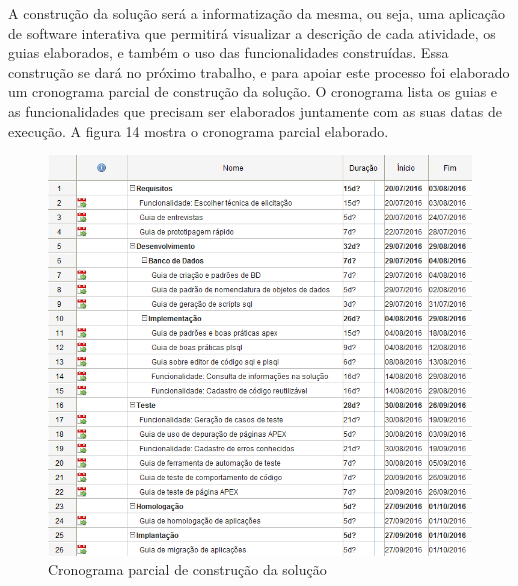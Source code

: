 A construção da solução será a informatização da mesma, ou seja, uma aplicação de software interativa que permitirá visualizar a descrição de cada atividade, os guias elaborados, e também o uso das funcionalidades construídas. Essa construção se dará no próximo trabalho, e para apoiar este processo foi elaborado um cronograma parcial de construção da solução. O cronograma lista os guias e as funcionalidades que precisam ser elaborados juntamente com as suas datas de execução. A figura 14 mostra o cronograma parcial elaborado. \clearpage

\begin{figure}[!htb]
	\centering
		\includegraphics[scale=0.92]{figuras/Cronograma_TCC2}
	\caption{Cronograma parcial de construção da solução}
\end{figure}
